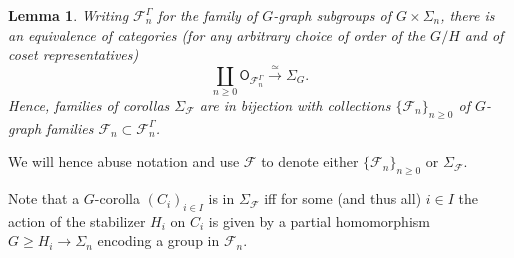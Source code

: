 \documentclass[a4paper,10pt
,draft
]{article}%
\numberwithin{equation}{section}
\numberwithin{figure}{section}
\newtheorem{lemma}[equation]{Lemma}%
\theoremstyle{definition} %
\newcommand{\F}{\ensuremath{\mathcal F}}
\newcommand{\1}{\ensuremath{\mathbbm 1}}%
\begin{document}
\begin{lemma}\label{FAMILY_COROLLAS_LEM}
Writing $\mathcal{F}_{n}^{\Gamma}$ for the family  of $G$-graph subgroups
of $G \times \Sigma_n$,
there is an equivalence of categories
(for any arbitrary choice of order of the $G/H$ and of coset representatives)
\[\coprod_{n \geq 0} \mathsf{O}_{\F_n^{\Gamma}} \xrightarrow{\simeq} \Sigma_G.\] 
Hence, families of corollas $\Sigma_{\mathcal{F}}$
are in bijection with collections
$\{\mathcal{F}_n\}_{n\geq 0}$
of $G$-graph families 
$\mathcal{F}_n \subset \mathcal{F}_{n}^{\Gamma}$.
\end{lemma}


%
%

We will hence abuse notation and use $\F$ to denote either $\{\mathcal{F}_n\}_{n \geq 0}$
or $\Sigma_\F$.

Note that a $G$-corolla $(C_i)_{i \in I}$
is in $\Sigma_\mathcal{F}$
iff for some (and thus all) 
$i \in I$ the action of the stabilizer 
$H_i$ on $C_i$
is given by a partial homomorphism
$G \geq H_i \to \Sigma_n$
encoding a group in $\mathcal{F}_n$.
\end{document}
